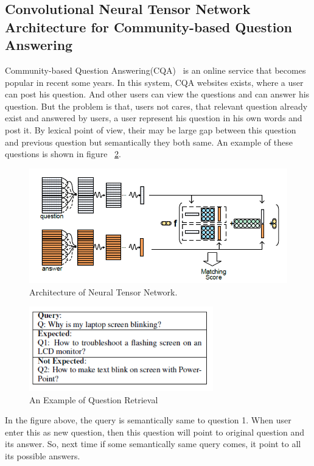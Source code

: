\documentclass{doublecol-new}
\theoremstyle{TH}{
\newtheorem{lemma}{Lemma}
\newtheorem{theorem}[lemma]{Theorem}
\newtheorem{corrolary}[lemma]{Corrolary}
\newtheorem{conjecture}[lemma]{Conjecture}
\newtheorem{proposition}[lemma]{Proposition}
\newtheorem{claim}[lemma]{Claim}
\newtheorem{stheorem}[lemma]{Wrong Theorem}
\newtheorem{algorithm}{Algorithm}
}
\theoremstyle{THrm}{
\newtheorem{definition}{Definition}[section]
\newtheorem{question}{Question}[section]
\newtheorem{remark}{Remark}
\newtheorem{scheme}{Scheme}
}
\theoremstyle{THhit}{
\newtheorem{case}{Case}[section]
}
\begin{document}
 
\subsection{Convolutional Neural Tensor Network Architecture for Community-based Question Answering}

Community-based Question Answering(CQA)~\cite{qiu2015convolutional} is an online service that becomes popular in recent some years. In this system, CQA websites exists, where a user can post his question. And other users can view the questions and can answer his question. But the problem is that, users not cares, that relevant question already exist and answered by users, a user represent his question in his own words and post it. By lexical point of view, their may be large gap between this question and previous question but semantically they both same. An example of these questions is shown in figure ~\ref{fig:questionretrival}. 
\begin{figure}[t]
	\centerline{\includegraphics[width=\textwidth]{image/NTN.PNG}}
	\caption{Architecture of Neural Tensor Network.}
	\label{fig:NTN}
\end{figure}

\begin{figure}[h]
	\centerline{\includegraphics[width=8cm,keepaspectratio]{image/questionretrival.PNG}}
	\caption{An Example of Question Retrieval}
	\label{fig:questionretrival}
\end{figure} 

In the figure above, the query is semantically same to question 1. When user enter this as new question, then this question will point to original question and its answer. So, next time if some semantically same query comes, it point to all its possible answers. 
\end{document}
